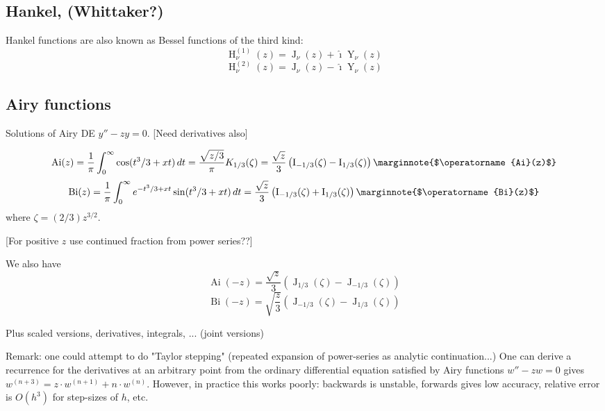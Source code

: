 \documentclass[10pt,dvipdfmx,letterpaper,twoside]{article}
\let\O=\operatorname
\newcommand{\ii}{{\hat{\imath}}}
\let\DEF=\marginnote
\begin{document}
\subsection{Hankel, (Whittaker?)}

Hankel functions are also known as Bessel functions of the third kind:
\[ \O{H}^{(1)}_\nu(z) = \O{J}_\nu(z) + \ii\O{Y}_\nu(z) \]
\[ \O{H}^{(2)}_\nu(z) = \O{J}_\nu(z) - \ii\O{Y}_\nu(z) \]

\subsection{Airy functions}
Solutions of Airy DE $y'' - z y = 0$.
[Need derivatives also]

\[ \O{Ai}(z) = \frac1\pi \int_0^\infty \cos(t^3/3 + xt)\,dt
  = \frac{\sqrt{z/3}}{\pi}K_{1/3}(\zeta)
  = \frac{\sqrt{z}}{3}\left( \O{I}_{-1/3}(\zeta) - \O{I}_{1/3}(\zeta) \right)
  \DEF{$\O{Ai}(z)$} \]
\[ \O{Bi}(z) = \frac1\pi \int_0^\infty e^{-t^3/3 + xt}\sin(t^3/3 + xt)\,dt
  = \frac{\sqrt{z}}{3}\left( \O{I}_{-1/3}(\zeta) + \O{I}_{1/3}(\zeta) \right)
  \DEF{$\O{Bi}(z)$} \]
where $\zeta = (2/3)z^{3/2}$.

[For positive $z$ use continued fraction from power series??]

We also have
\[ \O{Ai}(-z) = \frac{\sqrt{z}}{3}\left( \O{J}_{1/3}(\zeta) - \O{J}_{-1/3}(\zeta) \right) \]
\[ \O{Bi}(-z) = \sqrt{\frac{z}{3}}\left( \O{J}_{-1/3}(\zeta) - \O{J}_{1/3}(\zeta) \right) \]

Plus scaled versions, derivatives, integrals, ...
(joint versions)

Remark: one could attempt to do "Taylor stepping" (repeated expansion of power-series as analytic continuation...)
One can derive a recurrence for the derivatives at an arbitrary point from the ordinary differential equation satisfied
by Airy functions $w'' - zw = 0$ gives $w^{(n+3)} = z\cdot w^{(n+1)} + n\cdot w^{(n)}$.  However, in practice this works
poorly: backwards is unstable, forwards gives low accuracy, relative error is $O(h^3)$ for step-sizes of $h$, etc.
\end{document}
